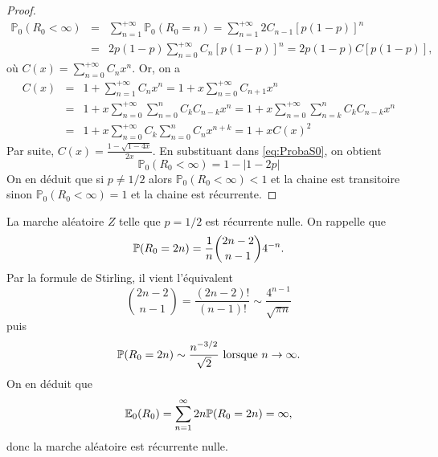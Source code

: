 \begin{proof}
\begin{eqnarray}
\mathbb{P}_0(R_0<\infty)&=&\sum_{n=1}^{+\infty}\mathbb{P}_0(R_0=n)=\sum_{n=1}^{+\infty}2C_{n-1}[p(1-p)]^{n}\nonumber\\
&=&2p(1-p)\sum_{n=0}^{+\infty}C_{n}[p(1-p)]^{n}=2p(1-p)C[p(1-p)],\label{eq:ProbaS0}
\end{eqnarray}
où $C(x)=\sum_{n=0}^{+\infty}C_nx^{n}$. Or, on a
\begin{eqnarray*}
C(x)&=&1+\sum_{n=1}^{+\infty}C_nx^{n}=1+x\sum_{n=0}^{+\infty}C_{n+1}x^{n}\\
&=&1+x\sum_{n=0}^{+\infty}\sum_{n=0}^{n}C_kC_{n-k}x^{n}=1+x\sum_{n=0}^{+\infty}\sum_{n=k}^{n}C_kC_{n-k}x^{n}\\
&=&1+x\sum_{n=0}^{+\infty}C_k\sum_{n=0}^{n}C_{n}x^{n+k}=1+xC(x)^{2}
\end{eqnarray*}
Par suite, $C(x)=\frac{1-\sqrt{1-4x}}{2x}$. En substituant dans \eqref{eq:ProbaS0}, on obtient
$$
\mathbb{P}_0(R_0<\infty)=1-|1-2p|
$$
On en déduit que si $p\neq 1/2$ alors $\mathbb{P}_0(R_0<\infty)<1$ et la chaine est transitoire sinon $\mathbb{P}_0(R_0<\infty)=1$ et la chaine est récurrente.
\end{proof}
\begin{remark}
La marche aléatoire $Z$ telle que $p=1/2$ est récurrente nulle. On rappelle que 
$$
\mathbb{P}(R_0 = 2n) =\frac{1}{n}\binom{2n-2}{n-1}4^{-n}.
$$
Par la formule de Stirling, il vient l'équivalent 
$$
\binom{2n-2}{n-1} = \frac{(2n-2)!}{(n-1)!}\sim \frac{4^{n-1}}{\sqrt{\pi n}}
$$
puis
$$
\mathbb{P}(R_0 = 2n)\sim \frac{n^{-3/2}}{\sqrt{2}}\text{ lorsque }n\rightarrow \infty.
$$
On en déduit que 
$$
\mathbb{E}_0(R_0) = \sum_{n =1}^{\infty} 2n\mathbb{P}(R_0 = 2n)=\infty,
$$
donc la marche aléatoire est récurrente nulle.
\end{remark}


